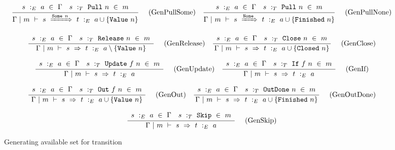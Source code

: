 
\begin{figure*}

$$
\frac {\displaystyle 
    \begin{array}{lr}
        s~:_E~ a ~\in~ \Gamma                    &
        s ~:_T~ \mathtt{Pull}~n ~\in~m 
    \end{array}
} {\displaystyle  
    \Gamma ~|~ m ~\vdash~ s~\xRightarrow{ \mathtt{Some}~n }~t ~:_E~  a \cup \{ \mathtt{Value}~n \} 
} \ 
\quad
\textrm{(GenPullSome)}
\quad
\frac {\displaystyle 
    \begin{array}{lr}
        s~:_E~ a ~\in~ \Gamma                    &
        s ~:_T~ \mathtt{Pull}~n ~\in~m
    \end{array}
} {\displaystyle  
    \Gamma ~|~ m ~\vdash~ s~\xRightarrow{ \mathtt{None}}~t ~:_E~  a \cup \{ \mathtt{Finished}~n \} 
} \ 
\quad
\textrm{(GenPullNone)}
$$

$$
\frac {\displaystyle 
    \begin{array}{lr}
        s~:_E~ a ~\in~ \Gamma                        &
        s ~:_T~ \mathtt{Release}~n ~\in~m
    \end{array}
} {\displaystyle  
    \Gamma ~|~ m ~\vdash~ s~\Rightarrow~t ~:_E~  a \setminus \{ \mathtt{Value}~n \} 
} \ 
\quad
\textrm{(GenRelease)}
\quad
\frac {\displaystyle 
    \begin{array}{lr}
        s~:_E~ a ~\in~ \Gamma                    &
        s ~:_T~ \mathtt{Close}~n ~\in~m
    \end{array}
} {\displaystyle  
    \Gamma ~|~ m ~\vdash~ s~\Rightarrow~t ~:_E~  a \cup \{ \mathtt{Closed}~n \} 
} \ 
\quad
\textrm{(GenClose)}
$$

$$
\frac {\displaystyle 
    \begin{array}{lr}
        s~:_E~ a ~\in~ \Gamma                        &
        s ~:_T~ \mathtt{Update}~f~n ~\in~m
    \end{array}
} {\displaystyle  
    \Gamma ~|~ m ~\vdash~ s~\Rightarrow~t ~:_E~  a 
} \ 
\quad
\textrm{(GenUpdate)}
\quad
\frac {\displaystyle 
    \begin{array}{lr}
        s~:_E~ a ~\in~ \Gamma                    &
        s ~:_T~ \mathtt{If}~f~n ~\in~m
    \end{array}
} {\displaystyle  
    \Gamma ~|~ m ~\vdash~ s~\Rightarrow~t ~:_E~  a 
} \ 
\quad
\textrm{(GenIf)}
$$

$$
\frac {\displaystyle 
    \begin{array}{lr}
        s~:_E~ a ~\in~ \Gamma                      &
        s ~:_T~ \mathtt{Out}~f~n ~\in~m
    \end{array}
} {\displaystyle  
    \Gamma ~|~ m ~\vdash~ s~\Rightarrow~t ~:_E~  a \cup \{ \mathtt{Value}~n \} 
} \ 
\quad
\textrm{(GenOut)}
\quad
\frac {\displaystyle 
    \begin{array}{lr}
        s~:_E~ a ~\in~ \Gamma                           &
        s ~:_T~ \mathtt{OutDone}~n ~\in~m
    \end{array}
} {\displaystyle  
    \Gamma ~|~ m ~\vdash~ s~\Rightarrow~t ~:_E~  a \cup \{ \mathtt{Finished}~n \} 
} \ 
\quad
\textrm{(GenOutDone)}
$$

$$
\frac {\displaystyle 
    \begin{array}{lr}
        s~:_E~ a ~\in~ \Gamma                 &
        s ~:_T~ \mathtt{Skip} ~\in~m
    \end{array}
} {\displaystyle  
    \Gamma ~|~ m ~\vdash~ s~\Rightarrow~t ~:_E~  a 
} \ 
\quad
\textrm{(GenSkip)}
$$


\caption{Generating available set for transition}
\label{fig:inv:generation}
\end{figure*}

